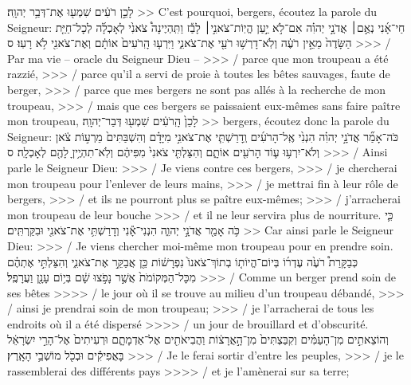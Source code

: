 \begin{paracol}[1]
  \verseSpace
  \verset
  {לָכֵ֣ן רֹעִ֔ים שִׁמְע֖וּ אֶת־דְּבַ֥ר יְהוָֽה׃}
  {>> C’est pourquoi, bergers, écoutez la parole du Seigneur:}
  \verset
  {חַי־אָ֜נִי נְאֻ֣ם׀ אֲדֹנָ֣י יְהוִ֗ה
    אִם־לֹ֣א יַ֣עַן הֱיֽוֹת־צֹאנִ֣י׀ לָבַ֡ז
    וַתִּֽהְיֶינָה֩ צֹאנִ֙י לְאָכְלָ֜ה לְכָל־חַיַּ֤ת הַשָּׂדֶה֙ מֵאֵ֣ין רֹעֶ֔ה
    וְלֹֽא־דָרְשׁ֥וּ רֹעַ֖י אֶת־צֹאנִ֑י
    וַיִּרְע֤וּ הָֽרֹעִים֙ אוֹתָ֔ם וְאֶת־צֹאנִ֖י לֹ֥א רָעֽוּ׃ ס}
  {>>> / Par ma vie – oracle du Seigneur Dieu –
    >>> / parce que mon troupeau a été razzié,
    >>> / parce qu’il a servi de proie à toutes les bêtes sauvages, faute de berger,
    >>> / parce que mes bergers ne sont pas allés à la recherche de mon troupeau,
    >>> / mais que ces bergers se paissaient eux-mêmes sans faire paître mon troupeau,}
  \verseSpace
  \verset
  {לָכֵן֙ הָֽרֹעִ֔ים שִׁמְע֖וּ דְּבַר־יְהוָֽה׃}
  {>> bergers, écoutez donc la parole du Seigneur:}
  \verset
  {כֹּה־אָמַ֞ר אֲדֹנָ֣י יְהוִ֗ה
    הִנְנִ֙י אֶֽל־הָרֹעִ֜ים
    וְֽדָרַשְׁתִּ֧י אֶת־צֹאנִ֣י מִיָּדָ֗ם
    וְהִשְׁבַּתִּים֙ מֵרְע֣וֹת צֹ֔אן
    וְלֹא־יִרְע֥וּ ע֛וֹד הָרֹעִ֖ים אוֹתָ֑ם
    וְהִצַּלְתִּ֤י צֹאנִי֙ מִפִּיהֶ֔ם
    וְלֹֽא־תִהְיֶ֥יןָ לָהֶ֖ם לְאָכְלָֽה׃ ס}
  {>>> / Ainsi parle le Seigneur Dieu:
    >>> / Je viens contre ces bergers,
    >>> / je chercherai mon troupeau pour l’enlever de leurs mains,
    >>> / je mettrai fin à leur rôle de bergers,
    >>> / et ils ne pourront plus se paître eux-mêmes;
    >>> / j’arracherai mon troupeau de leur bouche
    >>> / et il ne leur servira plus de nourriture.}
  \clearpage
  \verset
  {כִּ֛י כֹּ֥ה אָמַ֖ר אֲדֹנָ֣י יְהוִ֑ה
    הִנְנִי־אָ֕נִי וְדָרַשְׁתִּ֥י אֶת־צֹאנִ֖י וּבִקַּרְתִּֽים׃}
  {>> Car ainsi parle le Seigneur Dieu:
    >>> / Je viens chercher moi-même mon troupeau pour en prendre soin.}
  \verset
  {כְּבַקָּרַת֩ רֹעֶ֙ה עֶדְר֜וֹ
    בְּיוֹם־הֱיוֹת֤וֹ בְתוֹךְ־צֹאנוֹ֙ נִפְרָשׁ֔וֹת
    כֵּ֖ן אֲבַקֵּ֣ר אֶת־צֹאנִ֑י
    וְהִצַּלְתִּ֣י אֶתְהֶ֗ם מִכָּל־הַמְּקוֹמֹת֙ אֲשֶׁ֣ר נָפֹ֣צוּ שָׁ֔ם
    בְּי֥וֹם עָנָ֖ן וַעֲרָפֶֽל׃}
  {>>> / Comme un berger prend soin de ses bêtes
    >>>> / le jour où il se trouve au milieu d’un troupeau débandé,
    >>> / ainsi je prendrai soin de mon troupeau;
    >>> / je l’arracherai de tous les endroits où il a été dispersé
    >>>> / un jour de brouillard et d’obscurité.}
  \verset
  {וְהוֹצֵאתִ֣ים מִן־הָעַמִּ֗ים
    וְקִבַּצְתִּים֙ מִן־הָ֣אֲרָצ֔וֹת
    וַהֲבִיאֹתִ֖ים אֶל־אַדְמָתָ֑ם
    וּרְעִיתִים֙ אֶל־הָרֵ֣י יִשְׂרָאֵ֔ל
    בָּאֲפִיקִ֕ים
    וּבְכֹ֖ל מוֹשְׁבֵ֥י הָאָֽרֶץ׃}
  {>>> / Je le ferai sortir d’entre les peuples,
    >>> / je le rassemblerai des différents pays
    >>>> / et je l’amènerai sur sa terre;
}
\end{paracol}
